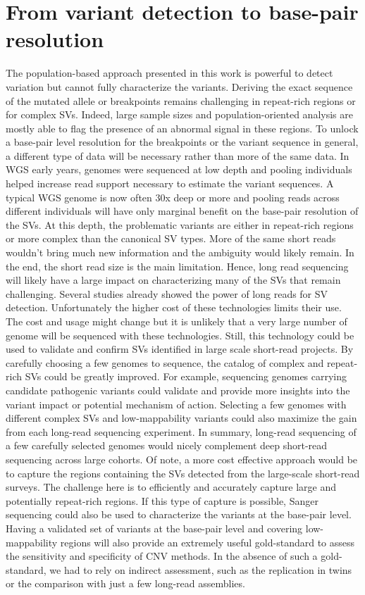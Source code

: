 \section*{From variant detection to base-pair resolution}
The population-based approach presented in this work is powerful to detect variation but cannot fully characterize the variants.
Deriving the exact sequence of the mutated allele or breakpoints remains challenging in repeat-rich regions or for complex SVs.
Indeed, large sample sizes and population-oriented analysis are mostly able to flag the presence of an abnormal signal in these regions.
To unlock a base-pair level resolution for the breakpoints or the variant sequence in general, a different type of data will be necessary rather than more of the same data.
In WGS early years, genomes were sequenced at low depth and pooling individuals helped increase read support necessary to estimate the variant sequences.
A typical WGS genome is now often 30x deep or more and pooling reads across different individuals will have only marginal benefit on the base-pair resolution of the SVs.
At this depth, the problematic variants are either in repeat-rich regions or more complex than the canonical SV types.
More of the same short reads wouldn't bring much new information and the ambiguity would likely remain.
In the end, the short read size is the main limitation.
Hence, long read sequencing will likely have a large impact on characterizing many of the SVs that remain challenging.
Several studies already showed the power of long reads for SV detection\cite{Chaisson2014,Pendleton2015}.
Unfortunately the higher cost of these technologies limits their use.
The cost and usage might change but it is unlikely that a very large number of genome will be sequenced with these technologies.
Still, this technology could be used to validate and confirm SVs identified in large scale short-read projects.
By carefully choosing a few genomes to sequence, the catalog of complex and repeat-rich SVs could be greatly improved.
For example, sequencing genomes carrying candidate pathogenic variants could validate and provide more insights into the variant impact or potential mechanism of action.
Selecting a few genomes with different complex SVs and low-mappability variants could also maximize the gain from each long-read sequencing experiment.
In summary, long-read sequencing of a few carefully selected genomes would nicely complement deep short-read sequencing across large cohorts.
Of note, a more cost effective approach would be to capture the regions containing the SVs detected from the large-scale short-read surveys.
The challenge here is to efficiently and accurately capture large and potentially repeat-rich regions.
If this type of capture is possible, Sanger sequencing could also be used to characterize the variants at the base-pair level.
Having a validated set of variants at the base-pair level and covering low-mappability regions will also provide an extremely useful gold-standard to assess the sensitivity and specificity of CNV methods.
In the absence of such a gold-standard, we had to rely on indirect assessment, such as the replication in twins or the comparison with just a few long-read assemblies.

